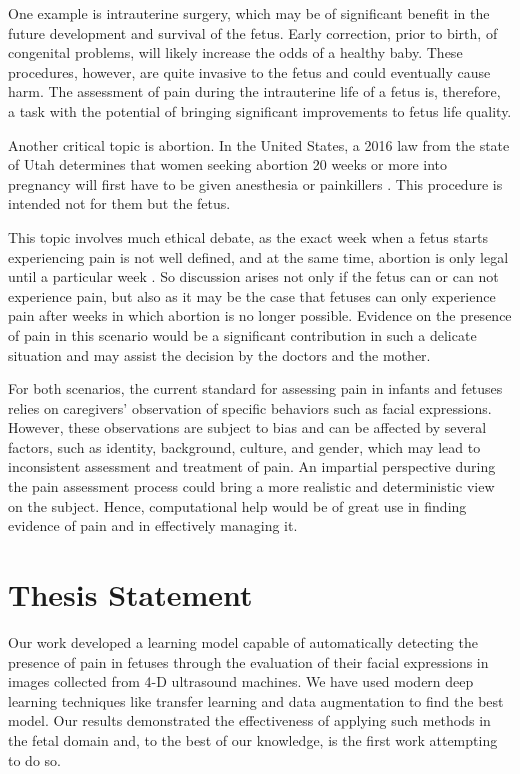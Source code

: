 One example is intrauterine surgery, which may be of significant benefit in the future development and survival of the fetus. Early correction, prior to birth, of congenital problems, will likely increase the odds of a healthy baby. These procedures, however, are quite invasive to the fetus and could eventually cause harm. The assessment of pain during the intrauterine life of a fetus is, therefore, a task with the potential of bringing significant improvements to fetus life quality. 

Another critical topic is abortion. In the United States, a 2016 law from the state of Utah determines that women seeking abortion 20 weeks or more into pregnancy will first have to be given anesthesia or painkillers \citep{healy2016nytimes}. This procedure is intended not for them but the fetus. 

This topic involves much ethical debate, as the exact week when a fetus starts experiencing pain is not well defined, and at the same time, abortion is only legal until a particular week \citep{Derbyshire2006}. So discussion arises not only if the fetus can or can not experience pain, but also as it may be the case that fetuses can only experience pain after weeks in which abortion is no longer possible. Evidence on the presence of pain in this scenario would be a significant contribution in such a delicate situation and may assist the decision by the doctors and the mother.

For both scenarios, the current standard for assessing pain in infants and fetuses relies on caregivers' observation of specific behaviors such as facial expressions. However, these observations are subject to bias and can be affected by several factors, such as identity, background, culture, and gender, which may lead to inconsistent assessment and treatment of pain. An impartial perspective during the pain assessment process could bring a more realistic and deterministic view on the subject. Hence, computational help would be of great use in finding evidence of pain and in effectively managing it.

\section{Thesis Statement}

Our work developed a learning model capable of automatically detecting the presence of pain in fetuses through the evaluation of their facial expressions in images collected from 4-D ultrasound machines. We have used modern deep learning techniques like transfer learning and data augmentation to find the best model. Our results demonstrated the effectiveness of applying such methods in the fetal domain and, to the best of our knowledge, is the first work attempting to do so.


